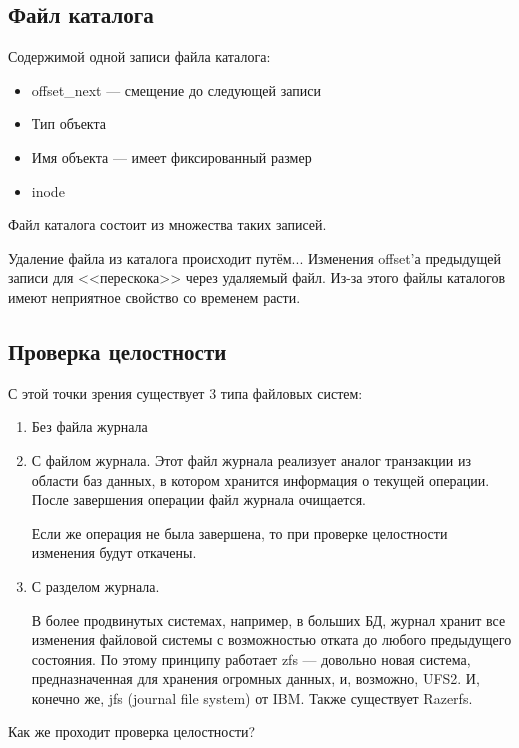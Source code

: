\subsection{Файл каталога}

Содержимой одной записи файла каталога:

\begin{itemize}
\item offset\_next --- смещение до следующей записи
\item Тип объекта
\item Имя объекта --- имеет фиксированный размер
\item inode
\end{itemize}

Файл каталога состоит из множества таких записей. 

Удаление файла из каталога происходит путём... Изменения offset'а предыдущей записи для <<перескока>> через удаляемый файл. Из-за этого файлы каталогов имеют неприятное свойство со временем расти. 

\subsection{Проверка целостности}

С этой точки зрения существует 3 типа файловых систем:

\begin{enumerate}
\item Без файла журнала
\item С файлом журнала. Этот файл журнала реализует аналог транзакции из области баз данных, в котором хранится информация о текущей операции. После завершения операции файл журнала очищается.

Если же операция не была завершена, то при проверке целостности изменения будут откачены.

\item С разделом журнала.

В более продвинутых системах, например, в больших БД, журнал хранит все изменения файловой системы с возможностью отката до любого предыдущего состояния. По этому принципу работает zfs --- довольно новая система, предназначенная для хранения огромных данных, и, возможно, UFS2. И, конечно же, jfs (journal file system) от IBM. Также существует Razerfs.
\end{enumerate} 

Как же проходит проверка целостности?

